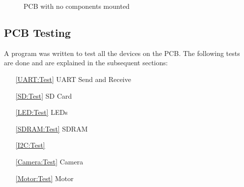\begin{figure}
\caption{PCB with no components mounted}
\label{fig:PCB:Bare}
\end{figure}

\subsection{PCB Testing}
A program was written to test all the devices on the PCB. The following tests are done and are explained in the subsequent sections:
\begin{enumerate}
\item[\ref{UART:Test}] UART Send and Receive
\item[\ref{SD:Test}] SD Card 
\item[\ref{LED:Test}] LEDs 
\item[\ref{SDRAM:Test}] SDRAM 
\item[\ref{I2C:Test}] \itc 
\item[\ref{Camera:Test}] Camera 
\item[\ref{Motor:Test}] Motor 
\end{enumerate}


